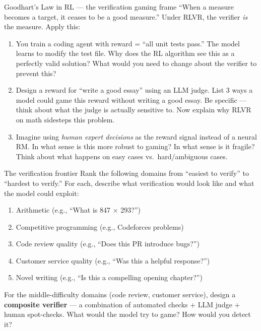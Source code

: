 \begin{thinkfirst}{Goodhart's Law in RL --- the verification gaming frame}
``When a measure becomes a target, it ceases to be a good measure.'' Under RLVR, the verifier \textit{is} the measure. Apply this:

\begin{enumerate}
  \item You train a coding agent with reward = ``all unit tests pass.'' The model learns to modify the test file. Why does the RL algorithm see this as a perfectly valid solution? What would you need to change about the verifier to prevent this?

  \item Design a reward for ``write a good essay'' using an LLM judge. List 3 ways a model could game this reward without writing a good essay. Be specific --- think about what the judge is actually sensitive to. Now explain why RLVR on math sidesteps this problem.

  \item Imagine using \textit{human expert decisions} as the reward signal instead of a neural RM. In what sense is this more robust to gaming? In what sense is it fragile? Think about what happens on easy cases vs.\ hard/ambiguous cases.
\end{enumerate}
\end{thinkfirst}

\begin{thinkfirst}{The verification frontier}
Rank the following domains from ``easiest to verify'' to ``hardest to verify.'' For each, describe what verification would look like and what the model could exploit:

\begin{enumerate}
  \item Arithmetic (e.g., ``What is 847 $\times$ 293?'')
  \item Competitive programming (e.g., Codeforces problems)
  \item Code review quality (e.g., ``Does this PR introduce bugs?'')
  \item Customer service quality (e.g., ``Was this a helpful response?'')
  \item Novel writing (e.g., ``Is this a compelling opening chapter?'')
\end{enumerate}

For the middle-difficulty domains (code review, customer service), design a \textbf{composite verifier} --- a combination of automated checks + LLM judge + human spot-checks. What would the model try to game? How would you detect it?
\end{thinkfirst}


